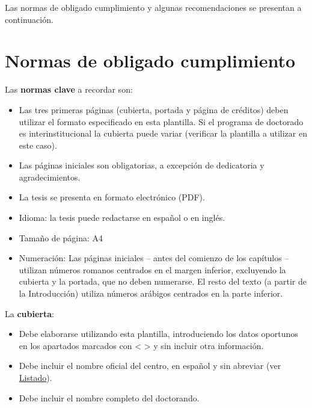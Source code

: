 Las normas de obligado cumplimiento y algunas recomendaciones se presentan a continuación. 

\section{Normas de obligado cumplimiento}
Las \textbf{normas clave} a recordar son:
\begin{itemize}
    \item Las tres primeras páginas (cubierta, portada y página de créditos) deben utilizar el formato especificado en esta plantilla. Si el programa de doctorado es interinstitucional la cubierta puede variar (verificar la plantilla a utilizar en este caso).
    \item Las páginas iniciales son obligatorias, a excepción de dedicatoria y agradecimientos.
    \item La tesis se presenta en formato electrónico (PDF).
    \item Idioma: la tesis puede redactarse en español o en inglés.
    \item Tamaño de página: A4
    \item Numeración: Las páginas iniciales – antes del comienzo de los capítulos – utilizan números romanos centrados en el margen inferior, excluyendo la cubierta y la portada, que no deben numerarse. El resto del texto (a partir de la Introducción) utiliza números arábigos centrados en la parte inferior.
\end{itemize}

La \textbf{cubierta}:
\begin{itemize}
    \item Debe elaborarse utilizando esta plantilla, introduciendo los datos oportunos en los apartados marcados con < > y sin incluir otra información.
    \item Debe incluir el nombre oficial del centro, en español y sin abreviar (ver \href{https://www.upm.es/sfs/Rectorado/Vicerrectorado%20de%20Investigacion/Doctorado/Tesis/impresos/5_Listado%20de%20PD%20y%20sus%20centros.pdf}{Listado}).
    \item Debe incluir el nombre completo del doctorando.
\end{itemize}

